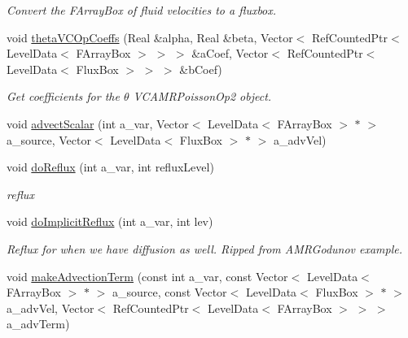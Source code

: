 \begin{DoxyCompactItemize}
\begin{DoxyCompactList}\small\item\em Convert the F\-Array\-Box of fluid velocities to a fluxbox. \end{DoxyCompactList}\item 
void \hyperlink{classamr_mushy_layer_ad1f6a703a258aa8a10185fcd72a6d988}{theta\-V\-C\-Op\-Coeffs} (Real \&alpha, Real \&beta, Vector$<$ Ref\-Counted\-Ptr$<$ Level\-Data$<$ F\-Array\-Box $>$ $>$ $>$ \&a\-Coef, Vector$<$ Ref\-Counted\-Ptr$<$ Level\-Data$<$ Flux\-Box $>$ $>$ $>$ \&b\-Coef)
\begin{DoxyCompactList}\small\item\em Get coefficients for the $ \theta $ V\-C\-A\-M\-R\-Poisson\-Op2 object. \end{DoxyCompactList}\item 
void \hyperlink{classamr_mushy_layer_aac3e8f11df8de976c0be9ab054a76e6b}{advect\-Scalar} (int a\-\_\-var, Vector$<$ Level\-Data$<$ F\-Array\-Box $>$ $\ast$ $>$ a\-\_\-source, Vector$<$ Level\-Data$<$ Flux\-Box $>$ $\ast$ $>$ a\-\_\-adv\-Vel)
\item 
\hypertarget{classamr_mushy_layer_a734cdc2ecc10363633bd1b6d4651dbb0}{void \hyperlink{classamr_mushy_layer_a734cdc2ecc10363633bd1b6d4651dbb0}{do\-Reflux} (int a\-\_\-var, int reflux\-Level)}\label{classamr_mushy_layer_a734cdc2ecc10363633bd1b6d4651dbb0}

\begin{DoxyCompactList}\small\item\em reflux \end{DoxyCompactList}\item 
\hypertarget{classamr_mushy_layer_a15862a52a9c7ef32d940d471260e79cb}{void \hyperlink{classamr_mushy_layer_a15862a52a9c7ef32d940d471260e79cb}{do\-Implicit\-Reflux} (int a\-\_\-var, int lev)}\label{classamr_mushy_layer_a15862a52a9c7ef32d940d471260e79cb}

\begin{DoxyCompactList}\small\item\em Reflux for when we have diffusion as well. Ripped from A\-M\-R\-Godunov example. \end{DoxyCompactList}\item 
\hypertarget{classamr_mushy_layer_aff391cf87d3082ffd28ba1ec6d10ece6}{void \hyperlink{classamr_mushy_layer_aff391cf87d3082ffd28ba1ec6d10ece6}{make\-Advection\-Term} (const int a\-\_\-var, const Vector$<$ Level\-Data$<$ F\-Array\-Box $>$ $\ast$ $>$ a\-\_\-source, const Vector$<$ Level\-Data$<$ Flux\-Box $>$ $\ast$ $>$ a\-\_\-adv\-Vel, Vector$<$ Ref\-Counted\-Ptr$<$ Level\-Data$<$ F\-Array\-Box $>$ $>$ $>$ a\-\_\-adv\-Term)}\label{classamr_mushy_layer_aff391cf87d3082ffd28ba1ec6d10ece6}


\end{DoxyCompactItemize}
